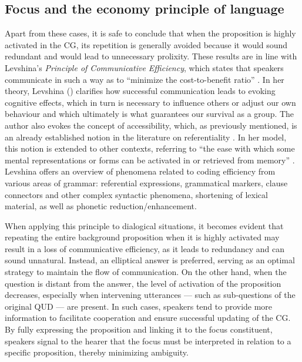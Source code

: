 \subsection{Focus and the economy principle of language} \label{sub:5.5.2}
Apart from these cases, it is safe to conclude that when the proposition is highly activated in the CG, its repetition is generally avoided because it would sound redundant and would lead to unnecessary prolixity. These results are in line with Levshina's \textit{Principle of Communicative Efficiency}, which states that speakers communicate in such a way as to ``minimize the cost-to-benefit ratio'' \parencite[30]{Levshina_2022}. In her theory, Levshina (\citeyear{Levshina_2022}) clarifies how successful communication leads to evoking cognitive effects, which in turn is necessary to influence others or adjust our own behaviour and which ultimately is what guarantees our survival as a group. The author also evokes the concept of accessibility, which, as previously mentioned, is an already established notion in the literature on referentiality \parencite{ariel2001accessibility, arnold2007effect}. In her model, this notion is extended to other contexts, referring to ``the ease with which some mental representations or forms can be activated in or retrieved from memory” \parencite[18]{Levshina_2022}. Levshina offers an overview of phenomena related to coding efficiency from various areas of grammar: referential expressions, grammatical markers, clause connectors and other complex syntactic phenomena, shortening of lexical material, as well as phonetic reduction/enhancement. 

When applying this principle to dialogical situations, it becomes evident that repeating the entire background proposition when it is highly activated may result in a loss of communicative efficiency, as it leads to redundancy and can sound unnatural. Instead, an elliptical answer is preferred, serving as an optimal strategy to maintain the flow of communication.
On the other hand, when the question is distant from the answer, the level of activation of the proposition decreases, especially when intervening utterances — such as sub-questions of the original QUD — are present. In such cases, speakers tend to provide more information to facilitate cooperation and ensure successful updating of the CG. By fully expressing the proposition and linking it to the focus constituent, speakers signal to the hearer that the focus must be interpreted in relation to a specific proposition, thereby minimizing ambiguity. 


